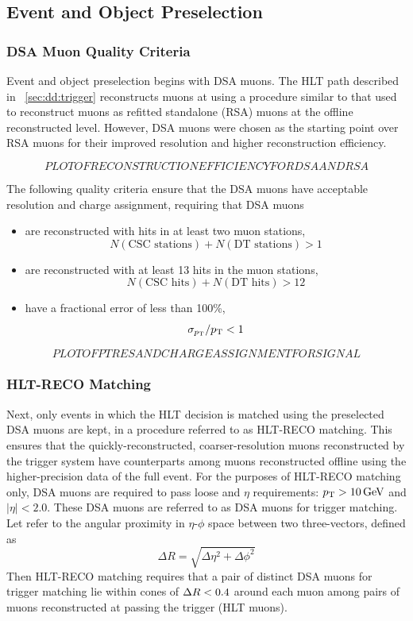 \subsection{Event and Object Preselection}
\subsubsection{DSA Muon Quality Criteria}
\label{sec:dd:DSAQuality}
Event and object preselection begins with DSA muons.
The HLT path described in \Sec~\ref{sec:dd:trigger} reconstructs muons at \Ltwo using a procedure similar to that used to reconstruct muons as refitted standalone (RSA) muons at the offline reconstructed level.
However, DSA muons were chosen as the starting point over RSA muons for their improved \pT resolution and higher reconstruction efficiency.

$$PLOT OF RECONSTRUCTION EFFICIENCY FOR DSA AND RSA$$

The following quality criteria ensure that the DSA muons have acceptable \pT resolution and charge assignment, requiring that DSA muons
\begin{itemize}
  \item are reconstructed with hits in at least two muon stations, \ie $$N(\text{CSC stations}) + N(\text{DT stations}) > 1$$
  \item are reconstructed with at least 13 hits in the muon stations, \ie $$N(\text{CSC hits}) + N(\text{DT hits}) > 12$$
  \item have a fractional \pT error of less than 100\%, \ie $$\sigma_{p_{\mathrm{T}}}/p_{\mathrm{T}} < 1$$
\end{itemize}

$$PLOT OF PT RES AND CHARGE ASSIGNMENT FOR SIGNAL$$

\subsubsection{HLT-RECO Matching}
Next, only events in which the HLT decision is matched using the preselected DSA muons are kept, in a procedure referred to as HLT-RECO matching.
This ensures that the quickly-reconstructed, coarser-resolution muons reconstructed by the trigger system have counterparts among muons reconstructed offline using the higher-precision data of the full event.
For the purposes of HLT-RECO matching only, DSA muons are required to pass loose \pT and $\eta$ requirements: $p_{\mathrm{T}} > 10\,\text{Ge\hspace{-.08em}V}$ and $|\eta| < 2.0$.
These DSA muons are referred to as DSA muons for trigger matching.
Let \deltaR refer to the angular proximity in $\eta$-$\phi$ space between two three-vectors, defined as
\begin{equation}
  \Delta R = \sqrt{\Delta\eta^2 + \Delta\phi^2}
  \label{eq:dd:deltaR}
\end{equation}
Then HLT-RECO matching requires that a pair of distinct DSA muons for trigger matching lie within cones of $\Delta R < 0.4$ around each muon among pairs of muons reconstructed at \Ltwo passing the trigger (HLT muons).


